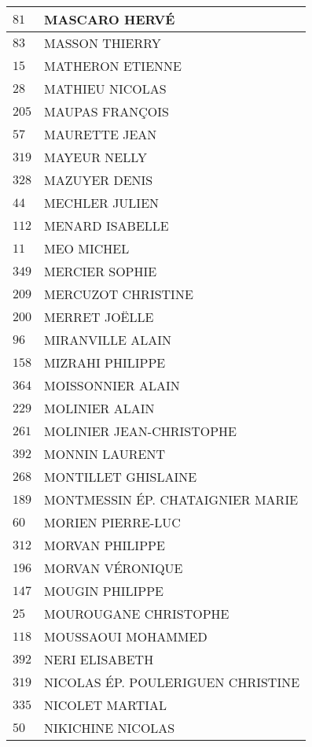 \begin{xltabular}{\linewidth}{|l|X|}
    \hline
    $81$ & MASCARO HERVÉ \\
    \hline
    $83$ & MASSON THIERRY \\
    \hline
    $15$ & MATHERON ETIENNE \\
    \hline
    $28$ & MATHIEU NICOLAS \\
    \hline
    $205$ & MAUPAS FRANÇOIS \\
    \hline
    $57$ & MAURETTE JEAN \\
    \hline
    $319$ & MAYEUR NELLY \\
    \hline
    $328$ & MAZUYER DENIS \\
    \hline
    $44$ & MECHLER JULIEN \\
    \hline
    $112$ & MENARD ISABELLE \\
    \hline
    $11$ & MEO MICHEL \\
    \hline
    $349$ & MERCIER SOPHIE \\
    \hline
    $209$ & MERCUZOT CHRISTINE \\
    \hline
    $200$ & MERRET JOËLLE \\
    \hline
    $96$ & MIRANVILLE ALAIN \\
    \hline
    $158$ & MIZRAHI PHILIPPE \\
    \hline
    $364$ & MOISSONNIER ALAIN \\
    \hline
    $229$ & MOLINIER ALAIN \\
    \hline
    $261$ & MOLINIER JEAN-CHRISTOPHE \\
    \hline
    $392$ & MONNIN LAURENT \\
    \hline
    $268$ & MONTILLET GHISLAINE \\
    \hline
    $189$ & MONTMESSIN ÉP. CHATAIGNIER MARIE \\
    \hline
    $60$ & MORIEN PIERRE-LUC \\
    \hline
    $312$ & MORVAN PHILIPPE \\
    \hline
    $196$ & MORVAN VÉRONIQUE \\
    \hline
    $147$ & MOUGIN PHILIPPE \\
    \hline
    $25$ & MOUROUGANE CHRISTOPHE \\
    \hline
    $118$ & MOUSSAOUI MOHAMMED \\
    \hline
    $392$ & NERI ELISABETH \\
    \hline
    $319$ & NICOLAS ÉP. POULERIGUEN CHRISTINE \\
    \hline
    $335$ & NICOLET MARTIAL \\
    \hline
    $50$ & NIKICHINE NICOLAS \\

\end{xltabular}
